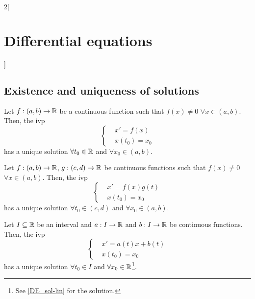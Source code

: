 \documentclass[../../../main.tex]{subfiles}
\begin{document}
\begin{multicols}{2}[\section{Differential equations}]
  \subsection{Existence and uniqueness of solutions}
  \begin{prop}
    Let $f:(a,b)\rightarrow\mathbb{R}$ be a continuous function such that $f(x)\ne 0$ $\forall x\in(a,b)$. Then, the ivp
    $$
      \left\{
      \begin{aligned}
         & x'      =f(x) \\
         & x(t_0)  =x_0
      \end{aligned}
      \right.
    $$
    has a unique solution $\forall t_0\in\mathbb{R}$ and $\forall x_0\in(a,b)$.
  \end{prop}
  \begin{prop}
    Let $f:(a,b)\rightarrow\mathbb{R}$, $g:(c,d)\rightarrow\mathbb{R}$ be continuous functions such that $f(x)\ne 0$ $\forall x\in(a,b)$. Then, the ivp
    $$\left\{
      \begin{aligned}
         & x'      =f(x)g(t) \\
         & x(t_0)  =x_0
      \end{aligned}
      \right.$$
    has a unique solution $\forall t_0\in(c,d)$ and $\forall x_0\in(a,b)$.
  \end{prop}
  \begin{prop}
    Let $I\subseteq\mathbb{R}$ be an interval and $a:I\rightarrow\mathbb{R}$ and $b:I\rightarrow\mathbb{R}$ be continuous functions. Then, the ivp
    $$\left\{
      \begin{aligned}
         & x'      =a(t)x+b(t) \\
         & x(t_0)  =x_0
      \end{aligned}
      \right.$$
    has a unique solution $\forall t_0\in I$ and $\forall x_0\in\mathbb{R}$\footnote{See \cref{DE_sol-lin} for the solution.}.
  \end{prop}

\end{multicols}
\end{document}
